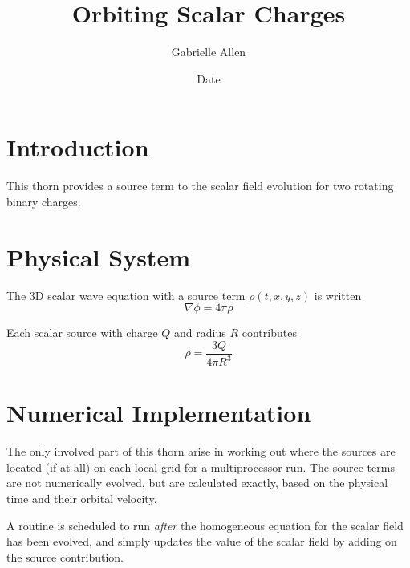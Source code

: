 \documentclass{article}
\begin{document}
\author{Gabrielle Allen} 

\title{Orbiting Scalar Charges}

\date{$ $Date$ $}


\maketitle



\begin{abstract}

\end{abstract}


\section{Introduction}

This thorn provides a source term to the scalar field evolution
for two rotating binary charges.


\section{Physical System}

The 3D scalar wave equation with a source term $\rho(t,x,y,z)$ is written
$$
\nabla \phi = 4 \pi \rho
$$

Each scalar source with charge $Q$ and radius $R$ contributes 
$$
\rho = \frac{3Q}{4\pi R^3}
$$

\section{Numerical Implementation}

The only involved part of this thorn arise in working out where the
sources are located (if at all) on each local grid for a multiprocessor
run. The source terms are not numerically evolved, but are calculated 
exactly, based on the physical time and their orbital velocity.

A routine is scheduled to run {\it after} the homogeneous equation
for the scalar field has been evolved, and simply updates the value
of the scalar field by adding on the source contribution.
\end{document}
